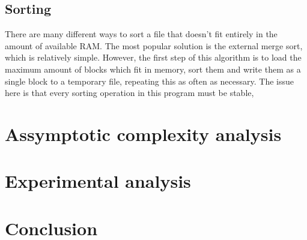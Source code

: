 \documentclass{article}
\begin{document}
\subsection*{Sorting}

There are many different ways to sort a file that doesn't fit entirely in the amount of available RAM. The most popular solution is the external merge sort, which is relatively simple. However, the first step of this algorithm is to load the maximum amount of blocks which fit in memory, sort them and write them as a single block to a temporary file, repeating this as often as necessary. The issue here is that every sorting operation in this program must be stable,


\section*{Assymptotic complexity analysis}

\section*{Experimental analysis}

\section*{Conclusion}
\end{document}
